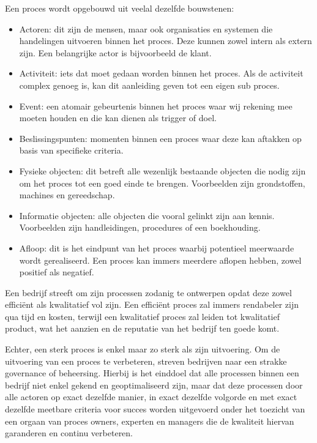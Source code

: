 Een proces wordt opgebouwd uit veelal dezelfde bouwstenen: \autocite[pp. 3-4]{Dumas2018}
\begin{itemize}
  \item Actoren: dit zijn de mensen, maar ook organisaties en systemen die handelingen uitvoeren binnen het proces. Deze kunnen zowel intern als extern zijn. Een belangrijke actor is bijvoorbeeld de klant.
  \item Activiteit: iets dat moet gedaan worden binnen het proces. Als de activiteit complex genoeg is, kan dit aanleiding geven tot een eigen sub proces. 
  \item Event: een atomair gebeurtenis binnen het proces waar wij rekening mee moeten houden en die kan dienen als trigger of doel.
  \item Beslissingspunten: momenten binnen een proces waar deze kan aftakken op basis van specifieke criteria.
  \item Fysieke objecten: dit betreft alle wezenlijk bestaande objecten die nodig zijn om het proces tot een goed einde te brengen. Voorbeelden zijn grondstoffen, machines en gereedschap.
  \item Informatie objecten: alle objecten die vooral gelinkt zijn aan kennis. Voorbeelden zijn handleidingen, procedures of een boekhouding.
  \item Afloop: dit is het eindpunt van het proces waarbij potentieel meerwaarde wordt gerealiseerd. Een proces kan immers meerdere aflopen hebben, zowel positief als negatief.
\end{itemize}

Een bedrijf streeft om zijn processen zodanig te ontwerpen opdat deze zowel efficiënt als kwalitatief vol zijn. Een efficiënt proces zal immers rendabeler zijn qua tijd en kosten, terwijl een kwalitatief proces zal leiden tot kwalitatief product, wat het aanzien en de reputatie van het bedrijf ten goede komt. \autocite[p. 2]{Dumas2018} \newline

Echter, een sterk proces is enkel maar zo sterk als zijn uitvoering. Om de uitvoering van een proces te verbeteren, streven bedrijven naar een strakke governance of beheersing. Hierbij is het einddoel dat alle processen binnen een bedrijf niet enkel gekend en geoptimaliseerd zijn, maar dat deze processen door alle actoren op exact dezelfde manier, in exact dezelfde volgorde en met exact dezelfde meetbare criteria voor succes worden uitgevoerd onder het toezicht van een orgaan van proces owners, experten en managers die de kwaliteit hiervan garanderen en continu verbeteren. \autocite[p. 79]{Harmon2014} \newline

